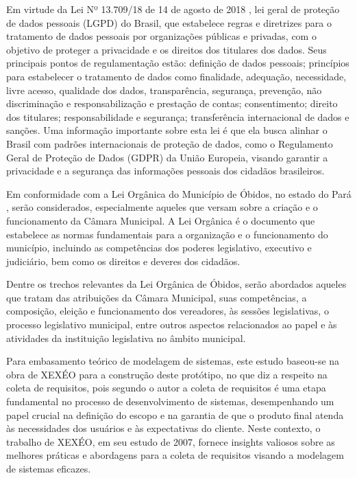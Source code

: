 \documentclass[12pt]{article}
\begin{document}
Em virtude da Lei Nº 13.709/18 de 14 de agosto de 2018 \parencite{lei137092018}, lei geral de proteção de dados pessoais (LGPD) do Brasil, que estabelece regras e diretrizes para o tratamento de dados pessoais por organizações públicas e privadas, com o objetivo de proteger a privacidade e os direitos dos titulares dos dados. Seus principais pontos de regulamentação estão: definição de dados pessoais; princípios para estabelecer o tratamento de dados como finalidade, adequação, necessidade, livre acesso, qualidade dos dados, transparência, segurança, prevenção, não discriminação e responsabilização e prestação de contas; consentimento; direito dos titulares; responsabilidade e segurança; transferência internacional de dados e sanções. Uma informação importante sobre esta lei é que ela busca alinhar o Brasil com padrões internacionais de proteção de dados, como o Regulamento Geral de Proteção de Dados (GDPR) da União Europeia, visando garantir a privacidade e a segurança das informações pessoais dos cidadãos brasileiros.

Em conformidade com a Lei Orgânica do Município de Óbidos, no estado do Pará \parencite{lei-obidos}, serão considerados, especialmente aqueles que versam sobre a criação e o funcionamento da Câmara Municipal. A Lei Orgânica é o documento que estabelece as normas fundamentais para a organização e o funcionamento do município, incluindo as competências dos poderes legislativo, executivo e judiciário, bem como os direitos e deveres dos cidadãos.

Dentre os trechos relevantes da Lei Orgânica de Óbidos, serão abordados aqueles que tratam das atribuições da Câmara Municipal, suas competências, a composição, eleição e funcionamento dos vereadores, às sessões legislativas, o processo legislativo municipal, entre outros aspectos relacionados ao papel e às atividades da instituição legislativa no âmbito municipal.

Para embasamento teórico de modelagem de sistemas, este estudo baseou-se na obra de XEXÉO \parencite{de2002modelagem} para a construção deste protótipo, no que diz a respeito na coleta de requisitos, pois segundo o autor a coleta de requisitos é uma etapa fundamental no processo de desenvolvimento de sistemas, desempenhando um papel crucial na definição do escopo e na garantia de que o produto final atenda às necessidades dos usuários e às expectativas do cliente. Neste contexto, o trabalho de XEXÉO, em seu estudo de 2007, fornece insights valiosos sobre as melhores práticas e abordagens para a coleta de requisitos visando a modelagem de sistemas eficazes.
\end{document}
